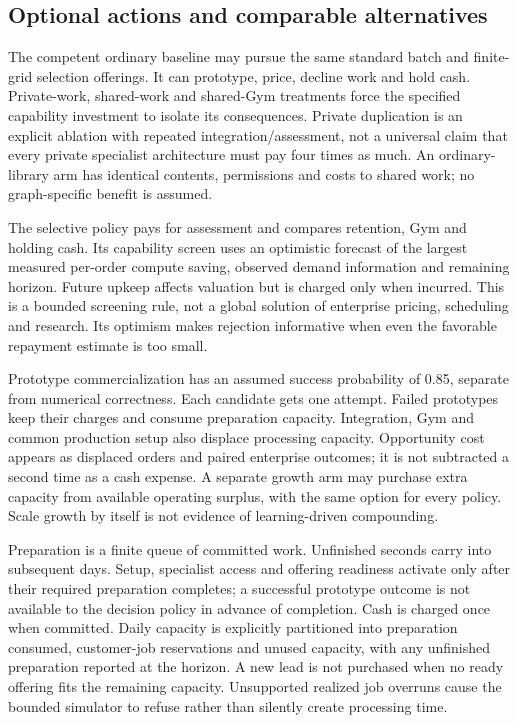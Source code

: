 \documentclass[11pt,letterpaper]{article}
\begin{document}
\subsection{Optional actions and comparable alternatives}

The competent ordinary baseline may pursue the same standard batch and finite-grid selection offerings. It can prototype, price, decline work and hold cash. Private-work, shared-work and shared-Gym treatments force the specified capability investment to isolate its consequences. Private duplication is an explicit ablation with repeated integration/assessment, not a universal claim that every private specialist architecture must pay four times as much. An ordinary-library arm has identical contents, permissions and costs to shared work; no graph-specific benefit is assumed.

The selective policy pays for assessment and compares retention, Gym and holding cash. Its capability screen uses an optimistic forecast of the largest measured per-order compute saving, observed demand information and remaining horizon. Future upkeep affects valuation but is charged only when incurred. This is a bounded screening rule, not a global solution of enterprise pricing, scheduling and research. Its optimism makes rejection informative when even the favorable repayment estimate is too small.

Prototype commercialization has an assumed success probability of 0.85, separate from numerical correctness. Each candidate gets one attempt. Failed prototypes keep their charges and consume preparation capacity. Integration, Gym and common production setup also displace processing capacity. Opportunity cost appears as displaced orders and paired enterprise outcomes; it is not subtracted a second time as a cash expense. A separate growth arm may purchase extra capacity from available operating surplus, with the same option for every policy. Scale growth by itself is not evidence of learning-driven compounding.

Preparation is a finite queue of committed work. Unfinished seconds carry into subsequent days. Setup, specialist access and offering readiness activate only after their required preparation completes; a successful prototype outcome is not available to the decision policy in advance of completion. Cash is charged once when committed. Daily capacity is explicitly partitioned into preparation consumed, customer-job reservations and unused capacity, with any unfinished preparation reported at the horizon. A new lead is not purchased when no ready offering fits the remaining capacity. Unsupported realized job overruns cause the bounded simulator to refuse rather than silently create processing time.
\end{document}
